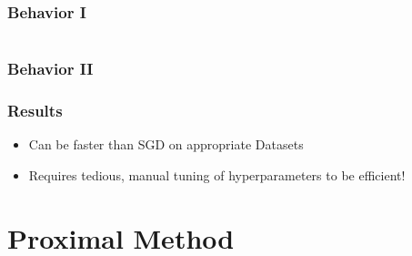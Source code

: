 \documentclass[10pt]{beamer}
\begin{document}
  \begin{frame}
    \frametitle{Behavior I}

      \begin{columns}[T]
      \begin{column}{.5\textwidth}
        \resizebox{\linewidth}{!}{}
      \end{column}\hfill
      \begin{column}{.5\textwidth}
        \resizebox{\linewidth}{!}{}
      \end{column}
    \end{columns}
  \end{frame}

  \begin{frame}
    \frametitle{Behavior II}
    \resizebox{\linewidth}{!}{}
  \end{frame}

  \begin{frame}\frametitle{Results}
    \begin{itemize}
      \item Can be faster than SGD on appropriate Datasets
      \item Requires tedious, manual tuning of hyperparameters to be efficient!
    \end{itemize}
  
  \end{frame}

 \section{Proximal Method}
\end{document}
